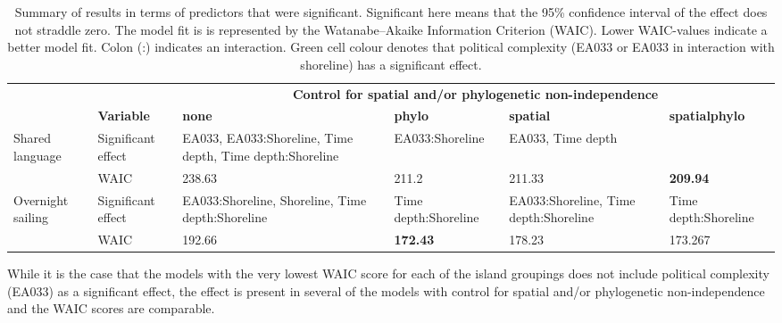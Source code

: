 \documentclass[unnumsec,webpdf,modern,medium]{oup-authoring-template}
\begin{document}

\begin{table}[ht]
\centering
\begin{tabular}{p{2cm}p{1.8cm}|p{2.4cm}p{2.4cm}p{2.4cm}p{2cm}}
  \toprule
&&  \multicolumn{4}{c}{\textbf{Control for spatial and/or phylogenetic non-independence}}\linebreak\\
 & \textbf{	Variable	} & \textbf{	none	} & \textbf{	phylo	} & \textbf{	spatial	} & \textbf{	spatialphylo	} 	\\
\midrule
\multirow{2}{*}{Shared language}
 	&	Significant effect	&	\cellcolor{spec_color_lightgreen!50} EA033, EA033:Shoreline, Time depth, Time depth:Shoreline	&	\cellcolor{spec_color_lightgreen!50} EA033:Shoreline	&	\cellcolor{spec_color_lightgreen!50} EA033, Time depth &		\\
		&	WAIC	&	238.63	&	211.2	&	211.33	&	 \textbf{209.94}	\\
  \midrule
\multirow{2}{*}{Overnight sailing}	&	Significant effect	&	\cellcolor{spec_color_lightgreen!50} EA033:Shoreline, Shoreline, Time depth:Shoreline	&	Time depth:Shoreline	&	\cellcolor{spec_color_lightgreen!50} EA033:Shoreline, Time depth:Shoreline &	Time depth:Shoreline		\\
	&	WAIC	&	192.66	&	\textbf{172.43}	&	178.23&	173.267		\\

   \bottomrule
\end{tabular}
\caption{Summary of results in terms of predictors that were significant. Significant here means that the 95\% confidence interval of the effect does not straddle zero. The model fit is is represented by the Watanabe–Akaike Information Criterion (WAIC). Lower WAIC-values indicate a better model fit. Colon (:) indicates an interaction. Green cell colour denotes that political complexity (EA033 or EA033 in interaction with shoreline) has a significant effect. } 
\label{brms_results_summary}
\end{table}


While it is the case that the models with the very lowest WAIC score for each of the island groupings does not include political complexity (EA033) as a significant effect, the effect is present in several of the models with control for spatial and/or phylogenetic non-independence and the WAIC scores are comparable. 
\end{document}
